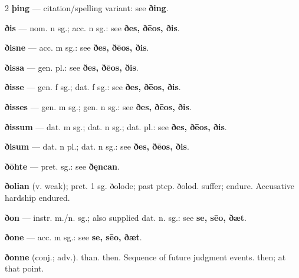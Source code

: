 \begin{multicols*}{2}
\textbf{þing} — citation/spelling variant: see \textbf{ðing}.\par
\textbf{ðis} — nom. n sg.; acc. n sg.: see \textbf{ðes, ðēos, ðis}.\par
\textbf{ðisne} — acc. m sg.: see \textbf{ðes, ðēos, ðis}.\par
\textbf{ðissa} — gen. pl.: see \textbf{ðes, ðēos, ðis}.\par
\textbf{ðisse} — gen. f sg.; dat. f sg.: see \textbf{ðes, ðēos, ðis}.\par
\textbf{ðisses} — gen. m sg.; gen. n sg.: see \textbf{ðes, ðēos, ðis}.\par
\textbf{ðissum} — dat. m sg.; dat. n sg.; dat. pl.: see \textbf{ðes, ðēos, ðis}.\par
\textbf{ðisum} — dat. n pl.; dat. n sg.: see \textbf{ðes, ðēos, ðis}.\par
\textbf{ðōhte} — pret. sg.: see \textbf{ðęncan}.\par
\textbf{ðolian} (v. weak); pret. 1 sg. ðolode; past ptcp. ðolod. suffer; endure. Accusative hardship endured.\par
\textbf{ðon} — instr. m./n. sg.; also supplied dat. n. sg.: see \textbf{se, sēo, ðæt}.\par
\textbf{ðone} — acc. m sg.: see \textbf{se, sēo, ðæt}.\par
\textbf{ðonne} (conj.; adv.). than. then. Sequence of future judgment events. then; at that point.\par

\end{multicols*}
